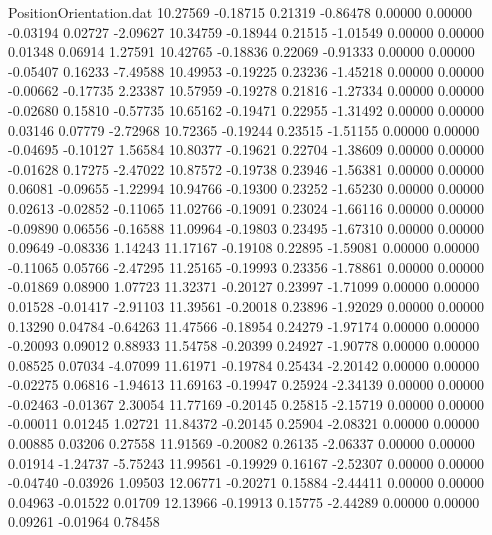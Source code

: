 \begin{filecontents}{PositionOrientation.dat}
  10.27569   -0.18715    0.21319    -0.86478    0.00000    0.00000   -0.03194    0.02727   -2.09627
  10.34759   -0.18944    0.21515    -1.01549    0.00000    0.00000    0.01348    0.06914    1.27591
  10.42765   -0.18836    0.22069    -0.91333    0.00000    0.00000   -0.05407    0.16233   -7.49588
  10.49953   -0.19225    0.23236    -1.45218    0.00000    0.00000   -0.00662   -0.17735    2.23387
  10.57959   -0.19278    0.21816    -1.27334    0.00000    0.00000   -0.02680    0.15810   -0.57735
  10.65162   -0.19471    0.22955    -1.31492    0.00000    0.00000    0.03146    0.07779   -2.72968
  10.72365   -0.19244    0.23515    -1.51155    0.00000    0.00000   -0.04695   -0.10127    1.56584
  10.80377   -0.19621    0.22704    -1.38609    0.00000    0.00000   -0.01628    0.17275   -2.47022
  10.87572   -0.19738    0.23946    -1.56381    0.00000    0.00000    0.06081   -0.09655   -1.22994
  10.94766   -0.19300    0.23252    -1.65230    0.00000    0.00000    0.02613   -0.02852   -0.11065
  11.02766   -0.19091    0.23024    -1.66116    0.00000    0.00000   -0.09890    0.06556   -0.16588
  11.09964   -0.19803    0.23495    -1.67310    0.00000    0.00000    0.09649   -0.08336    1.14243
  11.17167   -0.19108    0.22895    -1.59081    0.00000    0.00000   -0.11065    0.05766   -2.47295
  11.25165   -0.19993    0.23356    -1.78861    0.00000    0.00000   -0.01869    0.08900    1.07723
  11.32371   -0.20127    0.23997    -1.71099    0.00000    0.00000    0.01528   -0.01417   -2.91103
  11.39561   -0.20018    0.23896    -1.92029    0.00000    0.00000    0.13290    0.04784   -0.64263
  11.47566   -0.18954    0.24279    -1.97174    0.00000    0.00000   -0.20093    0.09012    0.88933
  11.54758   -0.20399    0.24927    -1.90778    0.00000    0.00000    0.08525    0.07034   -4.07099
  11.61971   -0.19784    0.25434    -2.20142    0.00000    0.00000   -0.02275    0.06816   -1.94613
  11.69163   -0.19947    0.25924    -2.34139    0.00000    0.00000   -0.02463   -0.01367    2.30054
  11.77169   -0.20145    0.25815    -2.15719    0.00000    0.00000   -0.00011    0.01245    1.02721
  11.84372   -0.20145    0.25904    -2.08321    0.00000    0.00000    0.00885    0.03206    0.27558
  11.91569   -0.20082    0.26135    -2.06337    0.00000    0.00000    0.01914   -1.24737   -5.75243
  11.99561   -0.19929    0.16167    -2.52307    0.00000    0.00000   -0.04740   -0.03926    1.09503
  12.06771   -0.20271    0.15884    -2.44411    0.00000    0.00000    0.04963   -0.01522    0.01709
  12.13966   -0.19913    0.15775    -2.44289    0.00000    0.00000    0.09261   -0.01964    0.78458

\end{filecontents}
